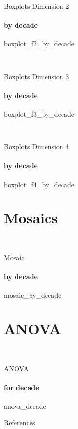 {\nologo
\begin{frame}{Boxplots Dimension 2}
    \framesubtitle{by decade}
    {boxplot_f2_by_decade}
\end{frame}
}

{\nologo
{}
\begin{frame}[c,plain]{}
    \vspace*{1cm}
    \centering
    \Huge
    \textcolor{white}{Boxplots Dimension 3}
\end{frame}
}

{\nologo
\begin{frame}{Boxplots Dimension 3}
    \framesubtitle{by decade}
    {boxplot_f3_by_decade}
\end{frame}
}

{\nologo
{}
\begin{frame}[c,plain]{}
    \vspace*{1cm}
    \centering
    \Huge
    \textcolor{white}{Boxplots Dimension 4}
\end{frame}
}

{\nologo
\begin{frame}{Boxplots Dimension 4}
    \framesubtitle{by decade}
    {boxplot_f4_by_decade}
\end{frame}
}

\section{Mosaics}

{\nologo
{}
\begin{frame}[c,plain]{}
    \vspace*{1cm}
    \centering
    \Huge
    \textcolor{white}{Mosaics}
\end{frame}
}

{\nologo
\begin{frame}{Mosaic}
    \framesubtitle{by decade}
    {mosaic_by_decade}
\end{frame}
}

\section{ANOVA}

{\nologo
{}
\begin{frame}[c,plain]{}
    \vspace*{1cm}
    \centering
    \Huge
    \textcolor{white}{ANOVA}
\end{frame}
}

{\nologo
\begin{frame}{ANOVA}
    \framesubtitle{for decade}
    {anova_decade}
\end{frame}
}

\appendix

{\nologo
\begin{frame}[allowframebreaks]{References}
    \printbibliography
\end{frame}
}
